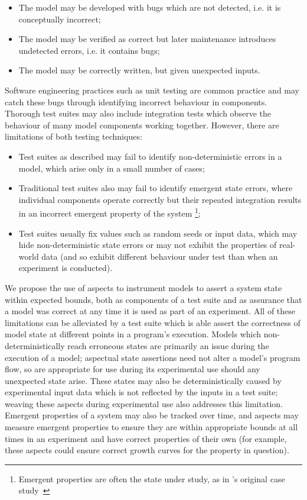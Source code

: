\begin{itemize}
    \item The model may be developed with bugs which are not detected, i.e. it is
    conceptually incorrect;
    \item The model may be verified as correct but later maintenance introduces
    undetected errors, i.e. it contains bugs;
    \item The model may be correctly written, but given unexpected inputs.
\end{itemize}

Software engineering practices such as unit testing are common practice and may
catch these bugs through identifying incorrect behaviour in components.
Thorough test suites may also include integration tests which observe the
behaviour of many model components working together. However, there are
limitations of both testing techniques:

\begin{itemize}
    \item Test suites as described may fail to identify non-deterministic errors
    in a model, which arise only in a small number of cases;
    \item Traditional test suites also may fail to identify emergent state
    errors, where individual components operate correctly but their repeated
    integration results in an incorrect emergent property of the system
    \footnote{Emergent properties are often the state under study, as in \pdsf's original
    case study~\cite{wallis2018caise}};
    \item Test suites usually fix values such as random seeds or input data,
    which may hide non-deterministic state errors or may not exhibit the
    properties of real-world data (and so exhibit different behaviour under test
    than when an experiment is conducted).
\end{itemize}

We propose the use of aspects to instrument models to assert a system state
within expected bounds, both as components of a test suite and as assurance that
a model was correct at any time it is used as part of an experiment. All of
these limitations can be alleviated by a test suite which is able assert the
correctness of model state at different points in a program's execution. Models
which non-deterministically reach erroneous states are primarily an issue during
the execution of a model; aspectual state assertions need not alter a model's
program flow, so are appropriate for use during its experimental use should any
unexpected state arise. These states may also be deterministically caused by
experimental input data which is not reflected by the inputs in a test suite;
weaving these aspects during experimental use also addresses this limitation.
Emergent properties of a system may also be tracked over time, and aspects may
measure emergent properties to ensure they are within appropriate bounds at all
times in an experiment and have correct properties of their own (for example,
these aspects could ensure correct growth curves for the property in question).

